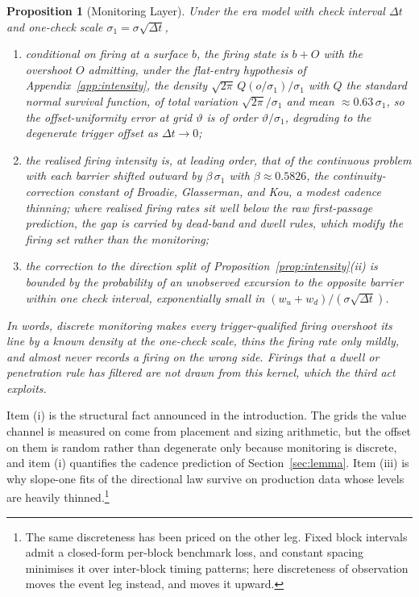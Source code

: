 \documentclass[11pt,a4paper]{article}
\theoremstyle{definition}
\theoremstyle{plain}
\newtheorem{proposition}{Proposition}
\theoremstyle{remark}
\newcommand{\surv}{Q}
\begin{document}
\begin{proposition}[Monitoring Layer]\label{prop:monitoring}
Under the era model with check interval $\Delta t$ and one-check scale $\sigma_1 = \sigma\sqrt{\Delta t}$,
\begin{enumerate}[label=(\roman*)]
\item conditional on firing at a surface $b$, the firing state is $b + O$ with the overshoot $O$ admitting, under the flat-entry hypothesis of Appendix~\ref{app:intensity}, the 
density $\sqrt{2\pi}\,
\surv(o/\sigma_1)/\sigma_1$ with $\surv$ the standard normal survival function, of total variation $\sqrt{2\pi}/\sigma_1$ and mean $\approx
0.63\,\sigma_1$, so 
the offset-uniformity error at grid $\vartheta$ is of order $\vartheta / \sigma_1$, degrading to the degenerate trigger offset as $\Delta t \to 0$;
\item the realised firing intensity is, at leading order, that of the continuous problem with each barrier shifted outward by $\beta\,\sigma_1$ with $\beta \approx 0.5826$, the 
continuity-correction constant of Broadie, Glasserman, and Kou,\cite{bgk1997} a modest cadence thinning; where realised firing rates sit well below the raw first-passage prediction, 
the gap is carried by dead-band and dwell rules, which modify the firing set rather than the monitoring;
\item the correction to the direction split of Proposition~\ref{prop:intensity}(ii) is bounded by the probability of an unobserved excursion to the opposite barrier within one check 
interval, exponentially small in $(w_u + w_d)/(\sigma \sqrt{\Delta t})$.
\end{enumerate}
\end{proposition}

\emph{In words, discrete monitoring makes every trigger-qualified firing overshoot its line by a known density at the one-check scale, thins the firing rate only mildly, 
and almost never records a firing on the wrong side. Firings that a dwell or penetration rule has filtered are not drawn from this kernel, which the third act exploits.}

Item (i) is the structural fact announced in the introduction. The grids the value channel is measured on come from placement and sizing arithmetic, but the offset on them is 
random rather than degenerate only because monitoring is discrete, and item (i) quantifies the cadence prediction of Section~\ref{sec:lemma}. Item (iii) is why slope-one fits 
of the directional law survive on production data whose levels are heavily thinned.\footnote{The same discreteness has been priced on the other leg. Fixed block intervals admit 
a closed-form per-block benchmark loss, and constant spacing minimises it over inter-block timing patterns\cite{nezlobin2025}; here discreteness of observation moves the event 
leg instead, and moves it upward.}
\end{document}
